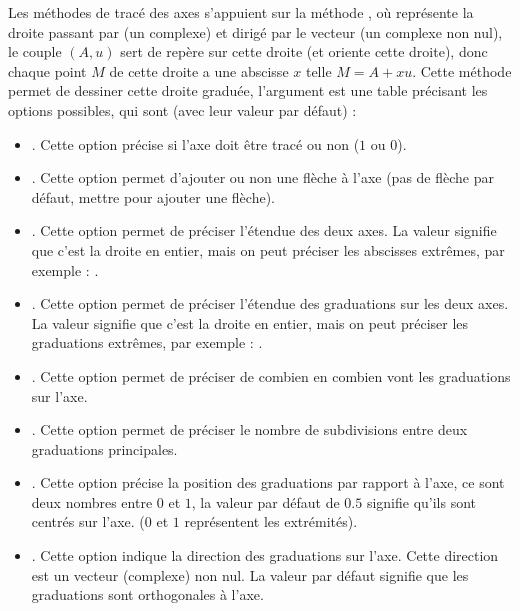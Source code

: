 Les méthodes de tracé des axes s'appuient sur la méthode , où  représente la droite passant par  (un complexe) et dirigé par le vecteur  (un complexe non nul), le couple $(A,u)$ sert de repère sur cette droite (et oriente cette droite), donc chaque point $M$ de cette droite a une abscisse $x$ telle $M=A+xu$. Cette méthode permet de dessiner cette droite graduée, l'argument  est une table précisant les options possibles, qui sont (avec leur valeur par défaut) :
\begin{itemize}
    \item {}. Cette option précise si l'axe doit être tracé ou non ($1$ ou $0$).
    
    \item {}. Cette option permet d'ajouter ou non une flèche à l'axe (pas de flèche par défaut, mettre  pour ajouter une flèche).
    
    \item {}. Cette option permet de préciser l'étendue des deux axes. La valeur  signifie que c'est la droite en entier, mais on peut préciser les abscisses extrêmes, par exemple : .
    
    \item {}. Cette option permet de préciser l'étendue des graduations sur les deux axes. La valeur  signifie que c'est la droite en entier, mais on peut préciser les graduations extrêmes, par exemple : .
    
    \item {}. Cette option permet de préciser de combien en combien vont les graduations sur l'axe.
    
    \item {}. Cette option permet de préciser le nombre de subdivisions entre deux graduations principales.
    
    \item {}. Cette option précise la position des graduations par rapport à l'axe, ce sont deux nombres entre $0$ et $1$, la valeur par défaut de $0.5$ signifie qu'ils sont centrés sur l'axe. ($0$ et $1$ représentent les extrémités).
    
    \item {}. Cette option indique la direction des graduations sur l'axe. Cette direction est un vecteur (complexe) non nul. La valeur par défaut  signifie que les graduations sont orthogonales à l'axe.
    

\end{itemize}
